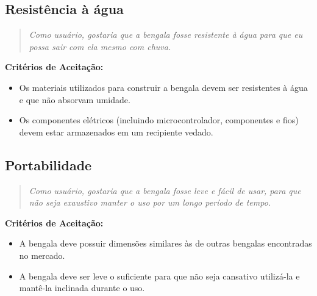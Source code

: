     \subsection{Resistência à água}
    \begin{quote}
    \textit{Como usuário, gostaria que a bengala fosse resistente à água para que eu possa sair com ela mesmo com chuva.}
    \end{quote}    
    \noindent\textbf{Critérios de Aceitação:}
    \begin{itemize}
        \item Os materiais utilizados para construir a bengala devem ser resistentes à água e que não absorvam umidade.
        \item Os componentes elétricos (incluindo microcontrolador, componentes e fios) devem estar armazenados em um recipiente vedado.
    \end{itemize}
        
    \subsection{Portabilidade}
    \begin{quote}
    \textit{Como usuário, gostaria que a bengala fosse leve e fácil de usar, para que não seja exaustivo manter o uso por um longo período de tempo.}
    \end{quote}    
    \noindent\textbf{Critérios de Aceitação:}
    \begin{itemize}
        \item A bengala deve possuir dimensões similares às de outras bengalas encontradas no mercado.
        \item A bengala deve ser leve o suficiente para que não seja cansativo utilizá-la e mantê-la inclinada durante o uso.
    \end{itemize}
                
